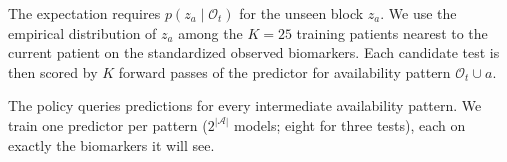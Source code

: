 The expectation requires $p(z_a\mid\mathcal{O}_t)$ for the unseen block $z_a$. We use the empirical distribution of $z_a$ among the $K=25$ training patients nearest to the current patient on the standardized observed biomarkers. Each candidate test is then scored by $K$ forward passes of the predictor for availability pattern $\mathcal{O}_t\cup a$.

The policy queries predictions for every intermediate availability pattern. We train one predictor per pattern ($2^{|\mathcal{A}|}$ models; eight for three tests), each on exactly the biomarkers it will see.

